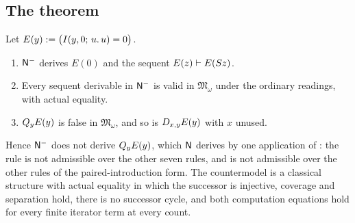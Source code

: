 \subsection{The theorem}

\begin{theorem}
\label{obs:thm:progress-independence}
Let $E(y)\mathrel{:=}\bigl(I(y,0;\,u.\,u)=0\bigr)$.
\begin{enumerate}[label=(\roman*)]
\item $\mathsf{N}^{-}$ derives $E(0)$ and the sequent $E(z)\vdash E(S z)$.
\item Every sequent derivable in $\mathsf{N}^{-}$ is valid in $\mathfrak{M}_\omega$
under the ordinary readings, with actual equality.
\item $Q_{y}E(y)$ is false in $\mathfrak{M}_\omega$, and so is
$D_{x,y}E(y)$ with $x$ unused.
\end{enumerate}
Hence $\mathsf{N}^{-}$ does not derive $Q_{y}E(y)$, which $\mathsf{N}$ derives by one
application of : the rule  is not admissible over the
other seven rules, and  is not admissible over the other
rules of the paired-introduction form. The countermodel is a classical
structure with actual equality in which the successor is injective, coverage
and separation hold, there is no successor cycle, and both computation
equations hold for every finite iterator term at every count.
\end{theorem}

